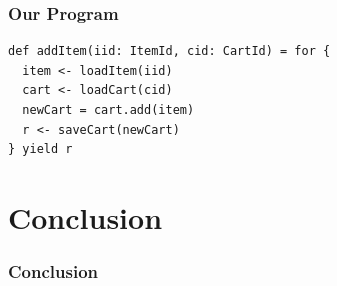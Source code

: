 \documentclass{beamer}
\begin{document}
\begin{frame}[fragile]
  \frametitle{Our Program}
\begin{verbatim}
def addItem(iid: ItemId, cid: CartId) = for {
  item <- loadItem(iid)
  cart <- loadCart(cid)
  newCart = cart.add(item)
  r <- saveCart(newCart)
} yield r
\end{verbatim}
\end{frame}

\section{Conclusion}

\begin{frame}
  \frametitle{Conclusion}
\end{frame}
\end{document}
